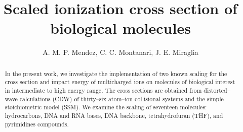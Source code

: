 \documentclass[10pt,showpacs,twocolumn]{revtex4}
\begin{document}
\title[Scaled ionization cross section of biological molecules]{
Scaled ionization cross section of biological molecules}
\author{A. M. P. Mendez, C. C. Montanari, J. E. Miraglia}


\begin{abstract}
In the present work, we investigate the implementation of two known
scaling for the cross section and impact energy of multicharged ions on 
molecules of biological interest in intermediate to high energy range. 
The cross sections are obtained from distorted--wave calculations (CDW) 
of thirty--six atom--ion collisional systems and the simple 
stoichiometric model (SSM). 
We examine the scaling of seventeen molecules: hydrocarbons, 
DNA and RNA bases, DNA backbone, tetrahydrofuran (THF), and pyrimidines
compounds. 
\end{abstract}


\maketitle

\end{document}
